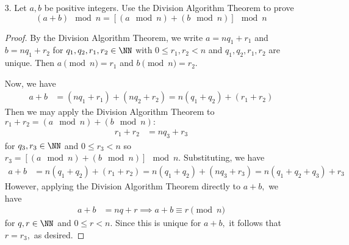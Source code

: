 \documentclass{article}
\begin{document}
\begin{itemize}
\begin{enumerate}[(a)]
		\end{enumerate}

	\item[3.] Let $a, b$ be positive integers. Use the Division Algorithm Theorem to prove
		\[(a+b)\mod n = \left[ (a\mod n) + (b\mod n) \right]\mod n\]
		\begin{proof}
			By the Division Algorithm Theorem, we write $a=nq_1+r_1$ and $b=nq_1+r_2$ for $q_1, q_2, r_1, r_2\in\NN$ with $0\le r_1, r_2< n$ and $q_1, q_2, r_1, r_2$ are unique. Then $a\pmod n = r_1$ and $b\pmod n=r_2.$

			Now, we have
			\begin{align*}
				a+b &= (nq_1+r_1) + (nq_2+r_2) = n(q_1+q_2) + (r_1+r_2)
			\end{align*}
			Then we may apply the Division Algorithm Theorem to $r_1+r_2 = (a\mod n) + (b\mod n):$
			\begin{align*}
				r_1+r_2 &= nq_3 + r_3
			\end{align*}
			for $q_3, r_3\in\NN$ and $0\le r_3<n$ so $r_3=\left[ (a\mod n) + (b\mod n) \right]\mod n.$ Substituting, we have
			\begin{align*}
				a+b &= n(q_1+q_2) + (r_1+r_2) = n(q_1+q_2) + (nq_3 + r_3) = n(q_1+q_2+q_3) + r_3
			\end{align*}
			However, applying the Division Algorithm Theorem directly to $a+b,$ we have
			\begin{align*}
				a+b &= nq+r \implies a+b\equiv r\pmod n
			\end{align*}
			for $q, r\in\NN$ and $0\le r<n.$ Since this is unique for $a+b,$ it follows that $r=r_3,$ as desired.
		\end{proof}


\end{itemize}
\end{document}
